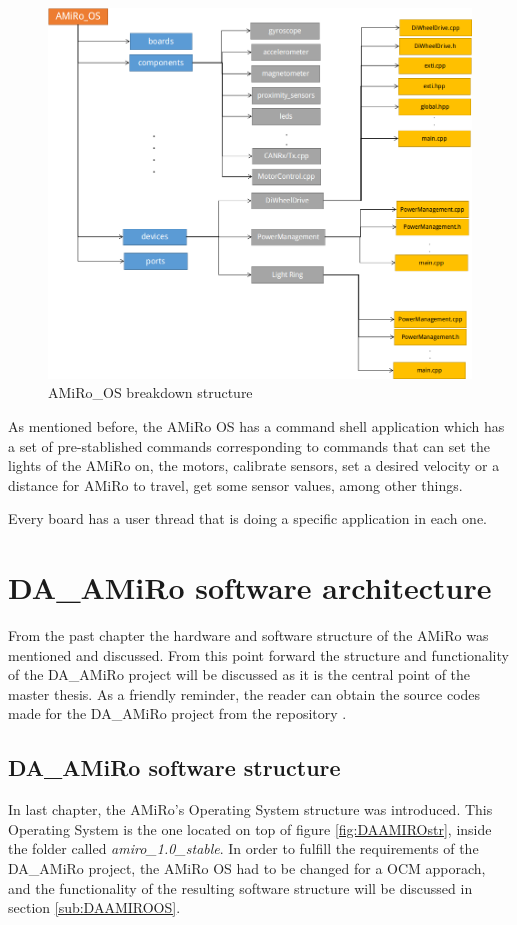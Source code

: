 \documentclass[12pt]{report}%
\begin{document}
\begin{figure}[ht]
	\centering
	\includegraphics[width=\textwidth]{AMiRo_OS}
    \caption{AMiRo\_OS breakdown structure}
    \label{fig:OS}
\end{figure}

As mentioned before, the AMiRo OS has a command shell application which has a set of pre-stablished commands corresponding to commands that can set the lights of the AMiRo on, the motors, calibrate sensors, set a desired velocity or a distance for AMiRo to travel, get some sensor values, among other things.

Every board has a user thread that is doing a specific application in each one.



\chapter{DA\_AMiRo software architecture}
From the past chapter the hardware and software structure of the AMiRo was mentioned and discussed. From this point forward the structure and functionality of the DA\_AMiRo project will be discussed as it is the central point of the master thesis. As a friendly reminder, the reader can obtain the source codes made for the DA\_AMiRo project from the repository \cite{AMiRo_Git}.

\section{DA\_AMiRo software structure}
In last chapter, the AMiRo's Operating System structure was introduced. This Operating System is the one located on top of figure \ref{fig:DAAMIROstr}, inside the folder called \textit{amiro\_1.0\_stable}. In order to fulfill the requirements of the DA\_AMiRo project, the AMiRo OS had to be changed for a OCM apporach, and the functionality of the resulting software structure will be discussed in section \ref{sub:DAAMIROOS}.
\end{document}
